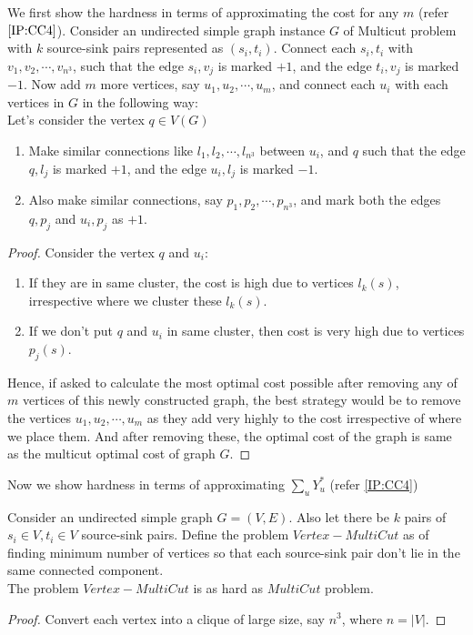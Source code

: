 We first show the hardness in terms of approximating the cost for any $m$ (refer $\ref{IP:CC4}$).
Consider an undirected simple graph instance $G$ of Multicut problem with $k$ source-sink pairs represented as $(s_i,t_i)$. Connect each $s_i,t_i$ with $v_1,v_2,\cdots, v_{n^3}$, such that the edge $s_i,v_j$ is marked $+1$, and the edge $t_i,v_j$ is marked $-1$. Now add $m$ more vertices, say $u_1,u_2,\cdots,u_m$, and connect each $u_i$ with each vertices in $G$ in the following way:\\
Let's consider the vertex $q\in V(G)$
\begin{enumerate}
    \item Make similar connections like $l_1,l_2,\cdots, l_{n^3}$ between $u_i$, and $q$ such that the edge $q,l_j$ is marked $+1$, and the edge $u_i,l_j$ is marked $-1$.
    \item Also make similar connections, say $p_1,p_2,\cdots,p_{n^3}$, and mark both the edges $q,p_j$ and $u_i,p_j$ as $+1$.
\end{enumerate}
\begin{proof}
Consider the vertex $q$ and $u_i$:
\begin{enumerate}
    \item If they are in same cluster, the cost is high due to vertices $l_k(s)$, irrespective where we cluster these $l_k(s)$.
    \item If we don't put $q$ and $u_i$ in same cluster, then cost is very high due to vertices $p_j(s)$.
\end{enumerate}
Hence, if asked to calculate the most optimal cost possible after removing any of $m$ vertices of this newly constructed graph, the best strategy would be to remove the vertices $u_1,u_2,\cdots,u_m$ as they add very highly to the cost irrespective of where we place them. And after removing these, the optimal cost of the graph is same as the multicut optimal cost of graph $G$.
\end{proof}

Now we show hardness in terms of approximating $\sum_uY_u^*$ (refer \ref{IP:CC4})\\
\begin{proposition}
Consider an undirected simple graph $G=(V,E)$. Also let there be $k$ pairs of $s_i\in V,t_i\in V$ source-sink pairs. Define the problem $Vertex-MultiCut$ as of finding minimum number of vertices so that each source-sink pair don't lie in the same connected component.\\
The problem $Vertex-MultiCut$ is as hard as $MultiCut$ problem.
\end{proposition}
\begin{proof}
Convert each vertex into a clique of large size, say $n^3$, where $n=|V|$.
\end{proof}